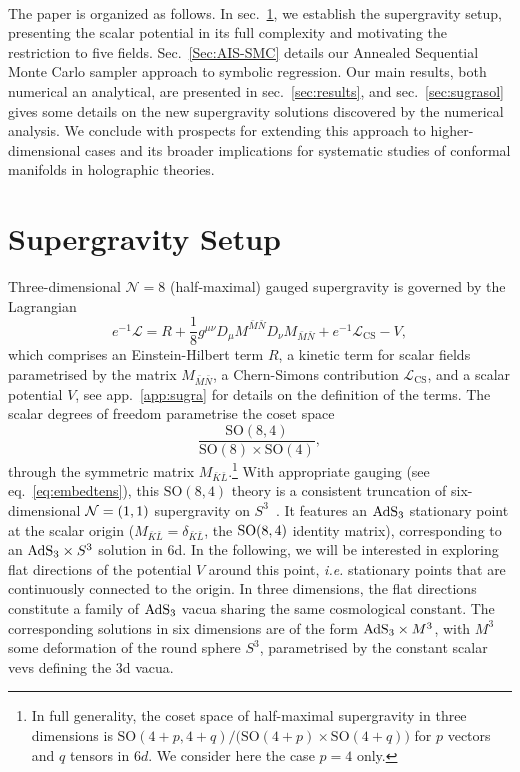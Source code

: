\documentclass[11pt,a4paper]{article}
\newcommand{\bK}{{\bar{K}}}
\newcommand{\bL}{{\bar{L}}}
\newcommand{\bM}{{\bar{M}}}
\newcommand{\bN}{{\bar{N}}}
\begin{document}
\paragraph{}
The paper is organized as follows. In sec.~\ref{sec:sugra}, we establish the supergravity setup, presenting the scalar potential in its full complexity and motivating the restriction to five fields. Sec.~\ref{Sec:AIS-SMC} details our Annealed Sequential Monte Carlo sampler approach to symbolic regression. Our main results, both numerical an analytical, are presented in sec.~\ref{sec:results}, and sec.~\ref{sec:sugrasol} gives some details on the new supergravity solutions discovered by the numerical analysis. We conclude with prospects for extending this approach to higher-dimensional cases and its broader implications for systematic studies of conformal manifolds in holographic theories.


\section{Supergravity Setup} \label{sec:sugra}
Three-dimensional $\mathcal{N}=8$ (half-maximal) gauged supergravity is governed by the Lagrangian~\cite{Nicolai:2001ac,deWit:2003ja}
%
\begin{equation}	\label{eq: lagrangian_rephrased} 
	e^{-1}\mathcal{L}=R+\frac1{8}g^{\mu\nu}D_\mu M^{\bM\bN}D_\nu M_{\bM\bN}+e^{-1}\mathcal{L}_{\text{CS}}-V,
\end{equation}
%
which comprises an Einstein-Hilbert term $R$, a kinetic term for scalar fields parametrised by the matrix $M_{\bM\bN}$, a Chern-Simons contribution $\mathcal{L}_{\text{CS}}$, and a scalar potential $V$, see app.~\ref{app:sugra} for details on the definition of the terms. The scalar degrees of freedom parametrise the coset space
%
\begin{equation}	\label{eq: scalarcoset_rephrased}
	\frac{\text{SO}(8,4)}{\text{SO}(8)\times\text{SO}(4)},
\end{equation}
%
through the symmetric matrix $M_{\bK\bL}$.\footnote{In full generality, the coset space of half-maximal supergravity in three dimensions is $\text{SO}(4+p,4+q)/\big(\text{SO}(4+p)\times\text{SO}(4+q)\big)$ for $p$ vectors and $q$ tensors in 6$d$. We consider here the case $p=4$ only.} With appropriate gauging (see eq.~\eqref{eq:embedtens}), this $\text{SO}(8,4)$ theory is a consistent truncation of six-dimensional ${\cal N}=(1,1)$ supergravity on $S^{3}$~\cite{Cvetic:2000dm,Deger:2014ofa,Hohm:2017wtr}. It features an ${\rm AdS}_{3}$ stationary point at the scalar origin ($M_{\bK\bL}=\delta_{\bK\bL}$, the ${\rm SO}(8,4)$ identity matrix), corresponding to an ${\rm AdS}_{3}\times S^{3}$ solution in 6d. In the following, we will be interested in exploring flat directions of the potential $V$ around this point, \textit{i.e.} stationary points that are continuously connected to the origin. In three dimensions, the flat directions constitute a family of ${\rm AdS}_{3}$ vacua sharing the same cosmological constant. The corresponding solutions in six dimensions are of the form ${\rm AdS}_{3}\times M^{3}$, with $M^{3}$ some deformation of the round sphere $S^{3}$, parametrised by the constant scalar vevs defining the 3d vacua.
\end{document}

